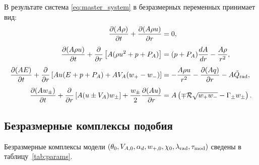 \documentclass[11pt,a4paper]{article}
\begin{document}
В результате система \eqref{eq:master_system} в безразмерных переменных принимает вид:
\begin{align}
\frac{\partial(A\rho)}{\partial t} + \frac{\partial(A\rho u)}{\partial r} &= 0,
\label{eq:nd_mass}\\[4pt]
\frac{\partial(A\rho u)}{\partial t} + \frac{\partial}{\partial r}\left[A(\rho u^2 + p + P_A)\right] &= (p + P_A)\frac{dA}{dr} - \frac{A\rho}{r^2},
\label{eq:nd_mom}\\[4pt]
\frac{\partial(A E)}{\partial t} + \frac{\partial}{\partial r}\left[A u(E + p + P_A) + A V_A(w_+ - w_-)\right] &= -\frac{A\rho u}{r^2} - \frac{\partial(A q)}{\partial r} - A\tilde{Q}_{\rm rad},
\label{eq:nd_energy}\\[4pt]
\frac{\partial(A w_\pm)}{\partial t} + \frac{\partial}{\partial r}\left[A(u \pm V_A)w_\pm\right] + \frac{w_\pm}{2}\frac{\partial(Au)}{\partial r} &= A\left(\mp\mathcal{R}\sqrt{w_+ w_-} - \Gamma_\pm w_\pm\right).
\label{eq:nd_waves}
\end{align}

\subsection{Безразмерные комплексы подобия}

Безразмерные комплексы модели $(\theta_0, V_{A,0}, \alpha_d, w_{+,0}, \chi_0, \lambda_{\rm rad}, \tau_{\rm mod})$ сведены в таблицу~\ref{tab:params}.
\end{document}
